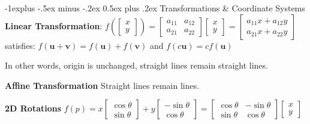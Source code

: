 \documentclass[letterpaper, 8pt]{extarticle}
\makeatletter
\renewcommand{\section}{\@startsection{section}{1}{0mm}%
                                {-1explus -.5ex minus -.2ex}%
                                {0.5ex plus .2ex}%
                                {\normalfont\small\bfseries}}
\makeatother
\begin{document}
\begin{multicols*}{4}

    \section{Transformations \& Coordinate Systems}
    \textbf{Linear Transformation}:
    \(
    f(\begin{bmatrix}
        x \\ y
    \end{bmatrix})
    = \begin{bmatrix}
        a_{11} & a_{12} \\
        a_{21} & a_{22}
    \end{bmatrix}
    \begin{bmatrix}
        x \\ y
    \end{bmatrix}
    =
    \begin{bmatrix}
        a_{11} x + a_{12} y \\
        a_{21} x + a_{22} y
    \end{bmatrix}
    \)
    satisfies: \(
    f(\mathbf{u} + \mathbf{v})
    = f(\mathbf{u}) + f(\mathbf{v})
    \)
    and
    \(
    f(c\mathbf{u}) = cf(\mathbf{u})
    \)

    In other words, origin is unchanged, straight lines remain straight lines.

    \textbf{Affine Transformation}
    Straight lines remain lines.

    \textbf{2D Rotations}
    \(
    f(p)
    = x \begin{bmatrix}
        \cos \theta \\ \sin \theta
    \end{bmatrix}
    + y \begin{bmatrix}
        -\sin \theta \\ \cos \theta
    \end{bmatrix}
    = \begin{bmatrix}
        \cos \theta & - \sin \theta \\
        \sin \theta & \cos \theta
    \end{bmatrix}
    \begin{bmatrix}
        x \\ y
    \end{bmatrix}
    \)


\end{multicols*}
\end{document}
